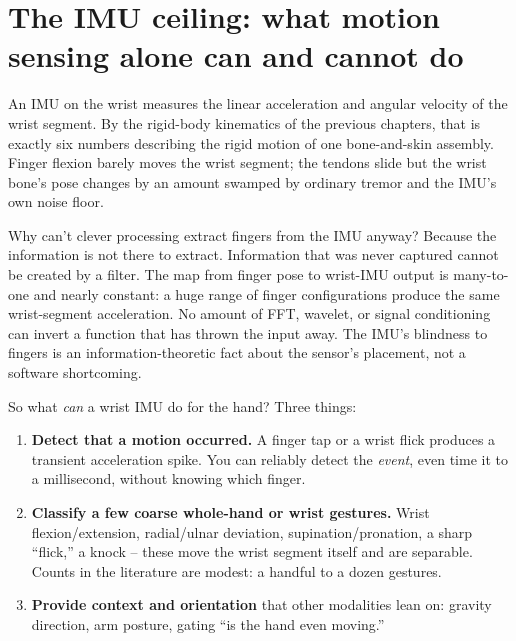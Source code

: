 \section{The IMU ceiling: what motion sensing alone can and cannot do}
\label{ch37:imu-ceiling}

An IMU on the wrist
measures the linear acceleration and angular velocity of the wrist segment. By the
rigid-body kinematics of the previous chapters, that is exactly six numbers
describing the rigid motion of one bone-and-skin assembly. Finger flexion barely
moves the wrist segment; the tendons slide but the wrist bone's pose changes by an
amount swamped by ordinary tremor and the IMU's own noise floor.

\begin{whybox}
Why can't clever processing extract fingers from the IMU anyway? Because the
information is not there to extract. Information that was never captured cannot be created by a
filter. The map from finger pose to wrist-IMU output is many-to-one and nearly
constant: a huge range of finger configurations produce the same
wrist-segment acceleration. No amount of FFT, wavelet, or signal conditioning can invert
a function that has thrown the input away. The IMU's blindness to fingers is an
information-theoretic fact about the sensor's placement, not a software shortcoming.
\end{whybox}

So what \emph{can} a wrist IMU do for the hand? Three things:

\begin{enumerate}
\item \textbf{Detect that a motion occurred.} A finger tap or a wrist flick produces
a transient acceleration spike. You can reliably detect the \emph{event}, even time
it to a millisecond, without knowing which finger.
\item \textbf{Classify a few coarse whole-hand or wrist gestures.} Wrist
flexion/extension, radial/ulnar deviation, supination/pronation, a sharp ``flick,''
a knock -- these move the wrist segment itself and are separable. Counts in the
literature are modest: a handful to a dozen gestures.
\item \textbf{Provide context and orientation} that other modalities lean on:
gravity direction, arm posture, gating ``is the hand even moving.''
\end{enumerate}

